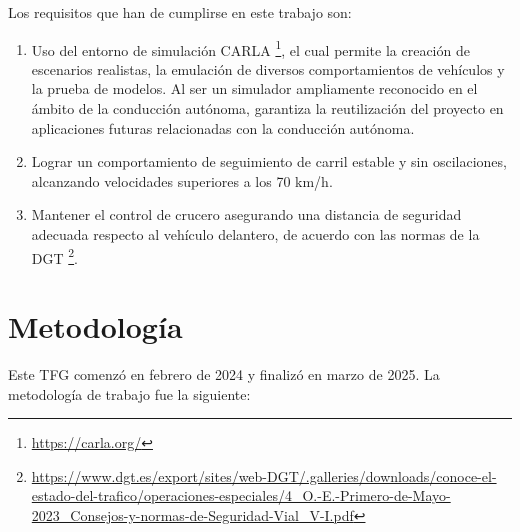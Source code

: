 Los requisitos que han de cumplirse en este trabajo son: 
\begin{enumerate}
\item Uso del entorno de simulación CARLA \footnote{\url{https://carla.org/}}, el cual permite la creación de escenarios realistas, la emulación de diversos comportamientos de vehículos y la prueba de modelos. Al ser un simulador ampliamente reconocido en el ámbito de la conducción autónoma, garantiza la reutilización del proyecto en aplicaciones futuras relacionadas con la conducción autónoma.
\item Lograr un comportamiento de seguimiento de carril estable y sin oscilaciones, alcanzando velocidades superiores a los 70 km/h.
\item Mantener el control de crucero asegurando una distancia de seguridad adecuada respecto al vehículo delantero, de acuerdo con las normas de la \ac{DGT} \footnote{\url{https://www.dgt.es/export/sites/web-DGT/.galleries/downloads/conoce-el-estado-del-trafico/operaciones-especiales/4_O.-E.-Primero-de-Mayo-2023_Consejos-y-normas-de-Seguridad-Vial_V-I.pdf}}.
\end{enumerate}

\section{Metodología}
\label{sec:metodologia}

Este TFG comenzó en febrero de 2024 y finalizó en marzo de 2025. La metodología de trabajo fue la siguiente:

